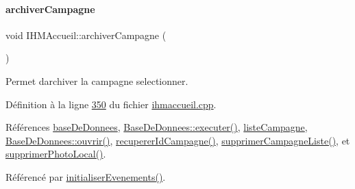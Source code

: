 \paragraph{\texorpdfstring{archiver\+Campagne}{archiverCampagne}}
{\footnotesize\ttfamily void I\+H\+M\+Accueil\+::archiver\+Campagne (\begin{DoxyParamCaption}{ }\end{DoxyParamCaption})\hspace{0.3cm}{\ttfamily [slot]}}



Permet d\textquotesingle{}archiver la campagne selectionner. 



Définition à la ligne \hyperlink{ihmaccueil_8cpp_source_l00350}{350} du fichier \hyperlink{ihmaccueil_8cpp_source}{ihmaccueil.\+cpp}.



Références \hyperlink{ihmaccueil_8h_source_l00040}{base\+De\+Donnees}, \hyperlink{basededonnees_8cpp_source_l00104}{Base\+De\+Donnees\+::executer()}, \hyperlink{ihmaccueil_8h_source_l00037}{liste\+Campagne}, \hyperlink{basededonnees_8cpp_source_l00063}{Base\+De\+Donnees\+::ouvrir()}, \hyperlink{ihmaccueil_8cpp_source_l00205}{recuperer\+Id\+Campagne()}, \hyperlink{ihmaccueil_8cpp_source_l00189}{supprimer\+Campagne\+Liste()}, et \hyperlink{ihmaccueil_8cpp_source_l00224}{supprimer\+Photo\+Local()}.



Référencé par \hyperlink{ihmaccueil_8cpp_source_l00084}{initialiser\+Evenements()}.


